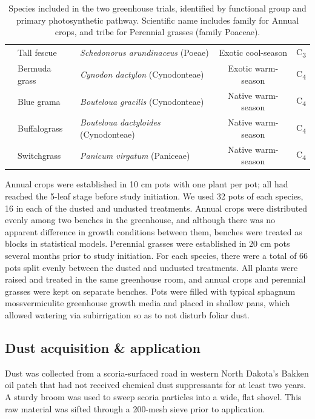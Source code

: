 \documentclass{svjour3}
\begin{document}
\begin{table}[]
\begin{tabular}{@{}lllcc@{}}
   & Tall fescue &  \emph{Schedonorus arundinaceus} (Poeae)  & Exotic cool-season  & C\textsubscript{3}  \\
  & Bermuda grass  &  \emph{Cynodon dactylon} (Cynodonteae)  & Exotic warm-season  & C\textsubscript{4}  \\
 & Blue grama  &  \emph{Bouteloua gracilis} (Cynodonteae)  & Native warm-season & C\textsubscript{4}  \\
  & Buffalograss  &  \emph{Bouteloua dactyloides} (Cynodonteae)  & Native warm-season & C\textsubscript{4}  \\
  & Switchgrass &  \emph{Panicum virgatum} (Paniceae)  & Native warm-season  & C\textsubscript{4}  \\
\bottomrule
\end{tabular}
\caption{Species included in the two greenhouse trials, identified by functional group and primary photosynthetic pathway. 
Scientific name includes family for Annual crops, and tribe for Perennial grasses (family Poaceae). }
\label{tab:spp}
\end{table}

Annual crops were established in 10 cm pots with one plant per pot; all had reached the 5-leaf stage before study initiation.
We used 32 pots of each species, 16 in each of the dusted and undusted treatments.
Annual crops were distributed evenly among two benches in the greenhouse, and although there was no apparent difference in growth conditions between them, benches were treated as blocks in statistical models.
Perennial grasses were established in 20 cm pots several months prior to study initiation. 
For each species, there were a total of 66 pots split evenly between the dusted and undusted treatments.
All plants were raised and treated in the same greenhouse room, and annual crops and perennial grasses were kept on separate benches. 
Pots were filled with typical sphagnum moss\textendash vermiculite greenhouse growth media and placed in shallow pans, which allowed watering via subirrigation so as to not disturb foliar dust.  


\subsection{Dust acquisition \& application}

Dust was collected from a scoria-surfaced road in western North Dakota's Bakken oil patch that had not received chemical dust suppressants for at least two years.
A sturdy broom was used to sweep scoria particles into a wide, flat shovel. 
This raw material was sifted through a 200-mesh sieve prior to application.  
\end{document}
